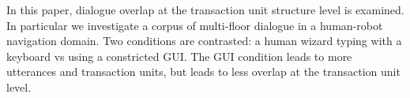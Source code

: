 In this paper, dialogue overlap at the transaction unit structure level is examined. In particular we investigate a corpus of multi-floor dialogue in a human-robot navigation domain. Two conditions are contrasted: a human wizard typing with a keyboard vs using a constricted GUI. The GUI condition leads to more utterances and transaction units, but leads to less overlap at the transaction unit level.
